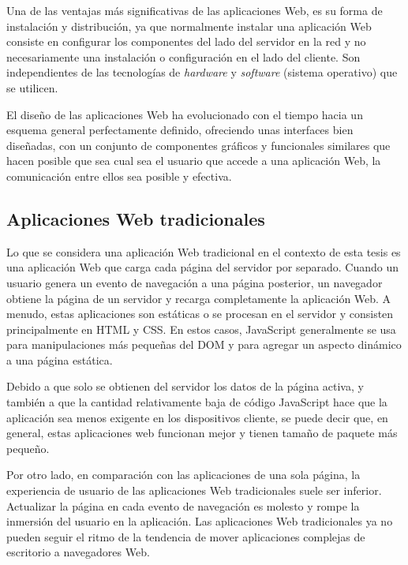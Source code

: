 Una de las ventajas más significativas de las aplicaciones Web, es su forma de instalación y distribución, ya que normalmente instalar una aplicación Web consiste en configurar los componentes del lado del servidor en la red y no necesariamente una instalación o configuración en el lado del cliente. Son independientes de las tecnologías de \textit{hardware} y \textit{software} (sistema operativo) que se utilicen.


El diseño de las aplicaciones Web ha evolucionado con el tiempo hacia un esquema general perfectamente definido, ofreciendo unas interfaces bien diseñadas, con un conjunto de componentes gráficos y funcionales similares que hacen posible que sea cual sea el usuario que accede a una aplicación Web, la comunicación entre ellos sea posible y efectiva.

\subsection{Aplicaciones Web tradicionales}
Lo que se considera una aplicación Web tradicional en el contexto de esta tesis es una aplicación Web que carga cada página del servidor por separado. Cuando un usuario genera un evento de navegación a una página posterior, un navegador obtiene la página de un servidor y recarga completamente la aplicación Web. A menudo, estas aplicaciones son estáticas o se procesan en el servidor y consisten principalmente en HTML y CSS. En estos casos, JavaScript generalmente se usa para manipulaciones más pequeñas del DOM y para agregar un aspecto dinámico a una página estática.

Debido a que solo se obtienen del servidor los datos de la página activa, y también a que la cantidad relativamente baja de código JavaScript hace que la aplicación sea menos exigente en los dispositivos cliente, se puede decir que, en general, estas aplicaciones web funcionan mejor y tienen tamaño de paquete más pequeño.

Por otro lado, en comparación con las aplicaciones de una sola página, la experiencia de usuario de las aplicaciones Web tradicionales suele ser inferior. Actualizar la página en cada evento de navegación es molesto y rompe la inmersión del usuario en la aplicación. Las aplicaciones Web tradicionales ya no pueden seguir el ritmo de la tendencia de mover aplicaciones complejas de escritorio a navegadores Web.

